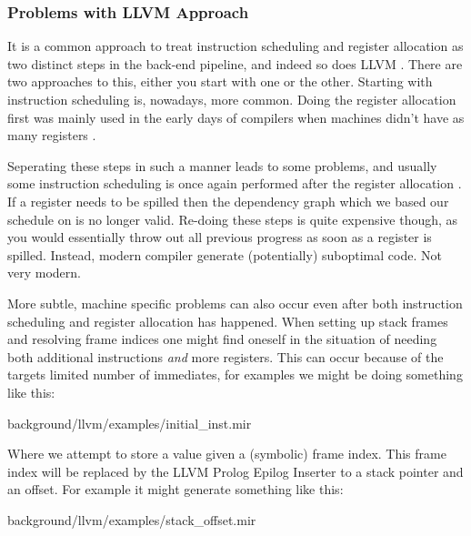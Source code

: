 {\subsubsection{Problems with LLVM Approach}
It is a common approach to treat instruction scheduling and register allocation as two
distinct steps in the back-end pipeline, and indeed so does LLVM \cite[Section~11.5]{aosa-llvm}.
There are two approaches to this, either you start with one or the other. Starting with
instruction scheduling is, nowadays, more common. Doing the register allocation first was
mainly used in the early days of compilers when machines didn't have as many registers
\cite[\pno~3]{combining-alloc-sched}.

Seperating these steps in such a manner leads to some problems, and usually some instruction
scheduling is once again performed after the register allocation \cite{welcome-to-backend}.
If a register needs to be spilled then the dependency graph which we based our schedule on is no longer valid. Re-doing
these steps is quite expensive though, as you would essentially throw out all previous
progress as soon as a register is spilled. Instead, modern compiler generate (potentially)
suboptimal code. Not very modern.

More subtle, machine specific problems can also occur even after both instruction scheduling
and register allocation has happened. When setting up stack frames and resolving frame
indices one might find oneself in the situation of needing both additional instructions
\textit{and} more registers. This can occur because of the targets limited number of immediates,
for examples we might be doing something like this:


{background/llvm/examples/initial_inst.mir}

Where we attempt to store a value given a (symbolic) frame index. This frame index will be replaced by
the LLVM Prolog Epilog Inserter to a stack pointer and an offset. For example it might
generate something like this:


{background/llvm/examples/stack_offset.mir}

}
